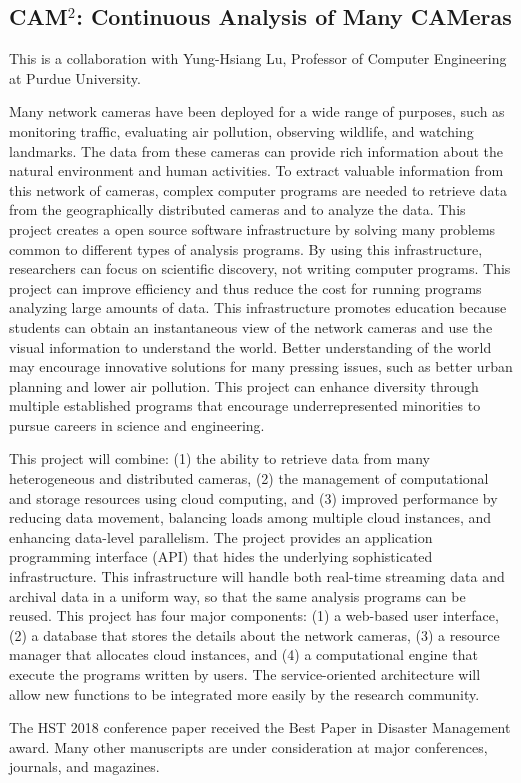 \subsection{CAM$^2$: Continuous Analysis of Many CAMeras}

This is a collaboration with Yung-Hsiang Lu, Professor of Computer Engineering at Purdue University.
\vspace{5pt}

Many network cameras have been deployed for a wide range of purposes, such as monitoring traffic, evaluating air pollution, observing wildlife, and watching landmarks. The data from these cameras can provide rich information about the natural environment and human activities. To extract valuable information from this network of cameras, complex computer programs are needed to retrieve data from the geographically distributed cameras and to analyze the data. This project creates a open source software infrastructure by solving many problems common to different types of analysis programs. By using this infrastructure, researchers can focus on scientific discovery, not writing computer programs. This project can improve efficiency and thus reduce the cost for running programs analyzing large amounts of data. This infrastructure promotes education because students can obtain an instantaneous view of the network cameras and use the visual information to understand the world. Better understanding of the world may encourage innovative solutions for many pressing issues, such as better urban planning and lower air pollution. This project can enhance diversity through multiple established programs that encourage underrepresented minorities to pursue careers in science and engineering.
\vspace{5pt}

This project will combine: (1) the ability to retrieve data from many heterogeneous and distributed cameras, (2) the management of computational and storage resources using cloud computing, and (3) improved performance by reducing data movement, balancing loads among multiple cloud instances, and enhancing data-level parallelism. The project provides an application programming interface (API) that hides the underlying sophisticated infrastructure. This infrastructure will handle both real-time streaming data and archival data in a uniform way, so that the same analysis programs can be reused. This project has four major components: (1) a web-based user interface, (2) a database that stores the details about the network cameras, (3) a resource manager that allocates cloud instances, and (4) a computational engine that execute the programs written by users. The service-oriented architecture will allow new functions to be integrated more easily by the research community.

\begin{refsection}
    \nocite{purdue_cam2_gauen_visual_datasets,purdue_cam2_hst2018,purdue_cam2_kaseb_resource_management}
    \printbibliography[heading=none]
\end{refsection}

The HST 2018 conference paper received the Best Paper in Disaster Management award. Many other manuscripts are under consideration at major conferences, journals, and magazines.
